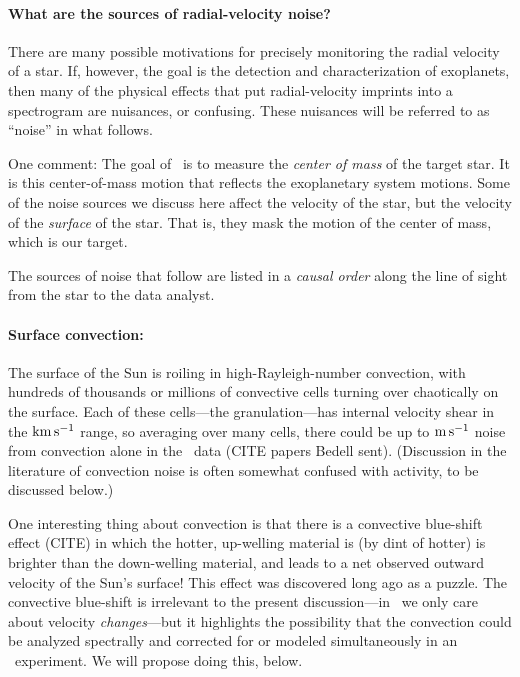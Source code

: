 \documentclass[12pt, fullpage, letterpaper]{article}
\begin{document}
\paragraph{What are the sources of radial-velocity noise?}
There are many possible motivations for precisely monitoring the radial
velocity of a star.
If, however, the goal is the detection and characterization of exoplanets,
then many of the physical effects that put radial-velocity imprints into
a spectrogram are nuisances, or confusing.
These nuisances will be referred to as ``noise'' in what follows.

One comment: The goal of \EPRV\ is to measure the \emph{center of mass} of
the target star.
It is this center-of-mass motion that reflects the exoplanetary system motions.
Some of the noise sources we discuss here affect the velocity of the star,
but the velocity of the \emph{surface} of the star. That is, they mask the
motion of the center of mass, which is our target.

The sources of noise that follow are listed in a \emph{causal order} along the
line of sight from the star to the data analyst.

\paragraph{Surface convection:}
The surface of the Sun is roiling in high-Rayleigh-number convection,
with hundreds of thousands or millions of convective cells turning
over chaotically on the surface. Each of these cells---the granulation---has internal
velocity shear in the ${\mathrm{km\,s^{-1}}}$ range, so averaging over many cells,
there could be up to ${\mathrm{m\,s^{-1}}}$ noise from convection alone in the
\EPRV\ data (CITE papers Bedell sent).
(Discussion in the literature of convection noise is often somewhat
confused with activity, to be discussed below.)

One interesting thing about convection is that there is a convective
blue-shift effect (CITE) in which the hotter, up-welling material is
(by dint of hotter) is brighter than the down-welling material, and leads
to a net observed outward velocity of the Sun's surface!
This effect was discovered long ago as a puzzle.
The convective blue-shift is irrelevant to the present discussion---in
\EPRV\ we only care about velocity \emph{changes}---but it highlights
the possibility that the convection could be analyzed spectrally and
corrected for or modeled simultaneously in an \EPRV\ experiment. We
will propose doing this, below.
\end{document}
